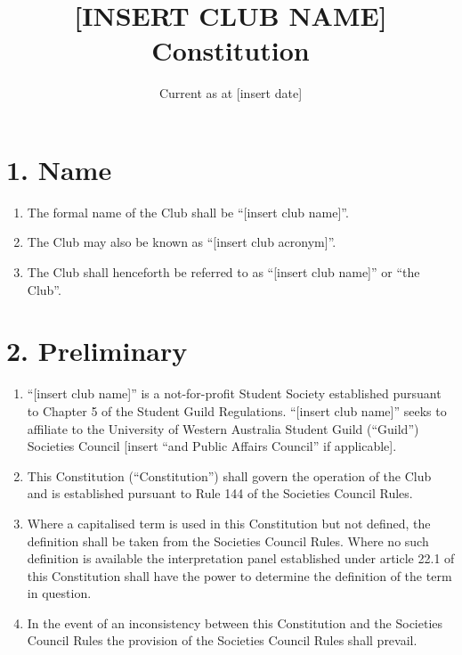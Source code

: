 \documentclass[12pt]{article}
\title{[INSERT CLUB NAME] Constitution}
\date{Current as at [insert date]}
\begin{document}
\maketitle

\tableofcontents

\section{1. Name}
\begin{enumerate}[label=1.\arabic*]
 \item The formal name of the Club shall be “[insert club name]”.
 \item The Club may also be known as “[insert club acronym]”.
 \item The Club shall henceforth be referred to as “[insert club name]” or “the Club”.
\end{enumerate}

\section{2. Preliminary}
\begin{enumerate}[label=2.\arabic*]
 \item “[insert club name]” is a not-for-profit Student Society established pursuant to Chapter 5 of the Student Guild Regulations. “[insert club name]” seeks to affiliate to the University of Western Australia Student Guild (“Guild”) Societies Council [insert “and Public Affairs Council” if applicable].
 \item This Constitution (“Constitution”) shall govern the operation of the Club and is established pursuant to Rule 144 of the Societies Council Rules.
\item Where a capitalised term is used in this Constitution but not defined, the definition shall be taken from the Societies Council Rules. Where no such definition is available the interpretation panel established under article 22.1 of this Constitution shall have the power to determine the definition of the term in question.
\item In the event of an inconsistency between this Constitution and the Societies Council Rules the provision of the Societies Council Rules shall prevail.
\end{enumerate}
\end{document}
